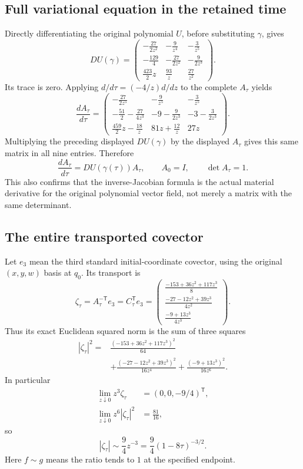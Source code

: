 \subsection{Full variational equation in the retained time}

Directly differentiating the original polynomial \(U\), before substituting
\(\gamma\), gives
\[
DU(\gamma)=
\begin{pmatrix}
-\frac{27}{2z^2}&-\frac9{z^4}&-\frac3{z^5}\\[3pt]
-\frac{129}4&-\frac{27}{2z^2}&-\frac9{2z^3}\\[3pt]
\frac{423}2z&\frac{93}z&\frac{27}{z^2}
\end{pmatrix}.
\]
Its trace is zero. Applying \(d/d\tau=(-4/z)d/dz\) to the complete
\(A_\tau\) yields
\[
\frac{dA_\tau}{d\tau}
=
\begin{pmatrix}
-\frac{27}{2z^5}&-\frac9{z^5}&-\frac3{z^5}\\[3pt]
-\frac{51}2-\frac{27}{4z^3}&
-9-\frac9{2z^3}&
-3-\frac3{2z^3}\\[3pt]
\frac{459}2z-\frac{18}z&
81z+\frac{12}z&
27z
\end{pmatrix}.
\]
Multiplying the preceding displayed \(DU(\gamma)\) by the displayed
\(A_\tau\) gives this same matrix in all nine entries. Therefore
\[
\frac{dA_\tau}{d\tau}=DU(\gamma(\tau))A_\tau,\qquad
A_0=I,\qquad\det A_\tau=1.
\]
This also confirms that the inverse-Jacobian formula is the actual material
derivative for the original polynomial vector field, not merely a matrix
with the same determinant.

\subsection{The entire transported covector}

Let \(e_3\) mean the third standard initial-coordinate covector, using the
original \((x,y,w)\) basis at \(q_0\). Its transport is
\[
\zeta_\tau=A_\tau^{-\mathsf T}e_3=C_\tau^{\mathsf T}e_3
=
\begin{pmatrix}
\frac{-153+36z^2+117z^3}8\\[3pt]
\frac{-27-12z^2+39z^3}{4z^2}\\[3pt]
\frac{-9+13z^3}{4z^3}
\end{pmatrix}.
\]
Thus its exact Euclidean squared norm is the sum of three squares
\[
\begin{aligned}
|\zeta_\tau|^2
={}&\frac{(-153+36z^2+117z^3)^2}{64}\\
 &+\frac{(-27-12z^2+39z^3)^2}{16z^4}
 +\frac{(-9+13z^3)^2}{16z^6}.
\end{aligned}
\]
In particular
\[
\begin{aligned}
\lim_{z\downarrow0}z^3\zeta_\tau
 &=(0,0,-9/4)^{\mathsf T},\\
\lim_{z\downarrow0}z^6|\zeta_\tau|^2
 &=\frac{81}{16},
\end{aligned}
\]
so
\[
|\zeta_\tau|\sim\frac94z^{-3}
=\frac94(1-8\tau)^{-3/2}.
\]
Here \(f\sim g\) means the ratio tends to \(1\) at the specified endpoint.

